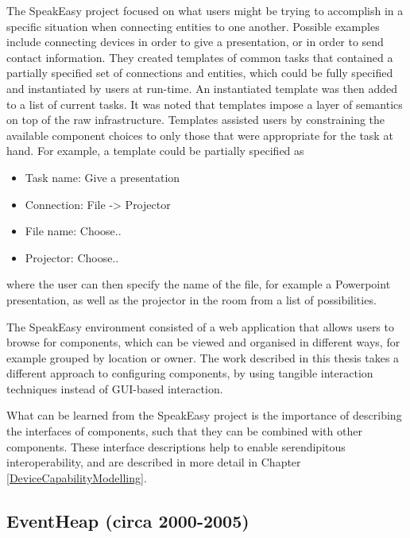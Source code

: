\label{InformationFiltering} %
The SpeakEasy project focused on what users might be trying to accomplish in a specific situation when connecting entities to one another. Possible examples include connecting devices in order to give a presentation, or in order to send contact information. They created templates of common tasks that contained a partially specified set of connections and entities, which could be fully specified and instantiated by users at run-time. An instantiated template was then added to a list of current tasks. It was noted that templates impose a layer of semantics on top of the raw infrastructure. Templates assisted users by constraining the available component choices to only those that were appropriate for the task at hand. For example, a template could be partially specified as

\begin{itemize}
	\item Task name: Give a presentation
	\item Connection: File -> Projector
	\item File name: Choose..
	\item Projector: Choose..
\end{itemize}

where the user can then specify the name of the file, for example a Powerpoint presentation, as well as the projector in the room from a list of possibilities.

The SpeakEasy environment consisted of a web application that allows users to browse for components, which can be viewed and organised in different ways, for example grouped by location or owner. The work described in this thesis takes a different approach to configuring components, by using tangible interaction techniques instead of \ac{GUI}-based interaction.

What can be learned from the SpeakEasy project is the importance of describing the interfaces of components, such that they can be combined with other components. These interface descriptions help to enable serendipitous interoperability, and are described in more detail in Chapter \ref{DeviceCapabilityModelling}. 


\subsection{EventHeap (circa 2000-2005)}

